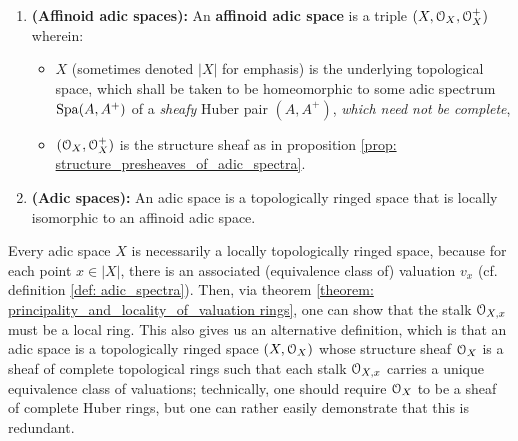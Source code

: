                     \begin{definition} \label{def: adic_spaces}
                        \noindent
                        \begin{enumerate}
                            \item \textbf{(Affinoid adic spaces):} An \textbf{affinoid adic space} is a triple $(X, \mathcal{O}_X, \mathcal{O}_X^+)$ wherein:
                                \begin{itemize}
                                    \item $X$ (sometimes denoted $|X|$ for emphasis) is the underlying topological space, which shall be taken to be homeomorphic to some adic spectrum $\mathrm{Spa}(A, A^+)$ of a \textit{sheafy} Huber pair $(A, A^+)$, \textit{which need not be complete},
                                    \item $(\mathcal{O}_X, \mathcal{O}_X^+)$ is the structure sheaf as in proposition \ref{prop: structure_presheaves_of_adic_spectra}.
                                \end{itemize}
                            \item \textbf{(Adic spaces):} An adic space is a topologically ringed space that is locally isomorphic to an affinoid adic space.
                        \end{enumerate}
                    \end{definition}
                    \begin{remark} \label{remark: adic_spaces_are_locally_ringed}
                        Every adic space $X$ is necessarily a locally topologically ringed space, because for each point $x \in |X|$, there is an associated (equivalence class of) valuation $v_x$ (cf. definition \ref{def: adic_spectra}). Then, via theorem \ref{theorem: principality_and_locality_of_valuation rings}, one can show that the stalk $\mathcal{O}_{X, x}$ must be a local ring. This also gives us an alternative definition, which is that an adic space is a topologically ringed space $(X, \mathcal{O}_X)$ whose structure sheaf $\mathcal{O}_X$ is a sheaf of complete topological rings such that each stalk $\mathcal{O}_{X, x}$ carries a unique equivalence class of valuations; technically, one should require $\mathcal{O}_X$ to be a sheaf of complete Huber rings, but one can rather easily demonstrate that this is redundant. 
                    \end{remark}
